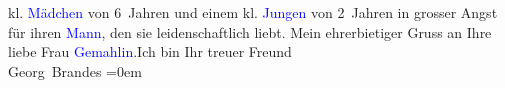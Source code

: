                     kl. \textcolor{blue}{Mädchen}{} von 6 Jahren
                    und einem kl. \textcolor{blue}{Jungen}{} von
                    2 Jahren in grosser Angst für ihren \textcolor{blue}{Mann}{}, den sie leidenschaftlich liebt.\pend
           \pstart
           Mein ehrerbietiger Gruss an Ihre liebe Frau \textcolor{blue}{Gemahlin}{}.\hspace*{2em}Ich bin
                    Ihr treuer Freund{\\[\baselineskip]}\spacefill\mbox{Georg Brandes}\pend
           \leftskip=0em{}\endnumbering{}  
      